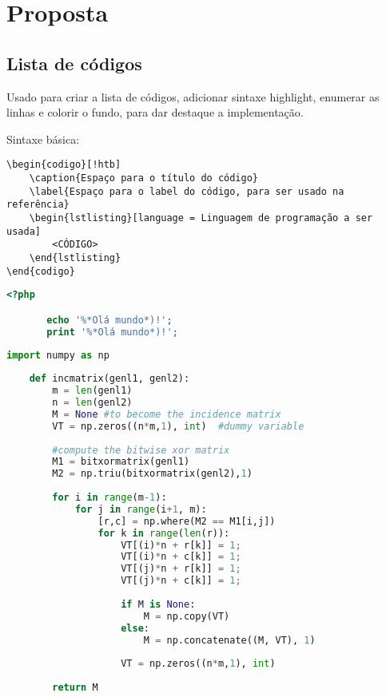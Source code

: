 \chapter{Proposta}

\section{Lista de códigos}

Usado para criar a lista de códigos, adicionar sintaxe highlight, enumerar as linhas e colorir o fundo, para dar destaque a implementação.

Sintaxe básica:
\begin{verbatim}
\begin{codigo}[!htb]
    \caption{Espaço para o título do código}
    \label{Espaço para o label do código, para ser usado na referência}  
    \begin{lstlisting}[language = Linguagem de programação a ser usada]
        <CÓDIGO>
    \end{lstlisting}
\end{codigo}
\end{verbatim}

\begin{codigo}[htb]
  \caption{Código PHP}
  \label{codigophp}
  \begin{lstlisting}[language = php]
       <?php

       echo '%*Olá mundo*)!';
       print '%*Olá mundo*)!';
  \end{lstlisting}
\end{codigo}

\begin{codigo}
  \caption{Código python}
  \label{codigopython}
  \begin{lstlisting}[language = python]
    import numpy as np
 
    def incmatrix(genl1, genl2):
        m = len(genl1)
        n = len(genl2)
        M = None #to become the incidence matrix
        VT = np.zeros((n*m,1), int)  #dummy variable
 
        #compute the bitwise xor matrix
        M1 = bitxormatrix(genl1)
        M2 = np.triu(bitxormatrix(genl2),1) 
 
        for i in range(m-1):
            for j in range(i+1, m):
                [r,c] = np.where(M2 == M1[i,j])
                for k in range(len(r)):
                    VT[(i)*n + r[k]] = 1;
                    VT[(i)*n + c[k]] = 1; 
                    VT[(j)*n + r[k]] = 1;
                    VT[(j)*n + c[k]] = 1;
 
                    if M is None:
                        M = np.copy(VT)
                    else:
                        M = np.concatenate((M, VT), 1)
 
                    VT = np.zeros((n*m,1), int)
 
        return M
\end{lstlisting}
\end{codigo}

